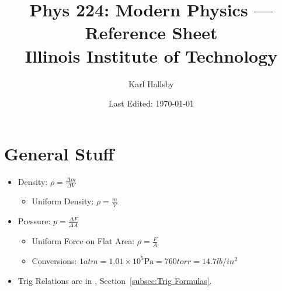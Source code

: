 


\graphicspath{{./Drawings/Phys_224/}} %

\theoremstyle{remark}
\newtheorem{note}{Note}[definition] %
\newtheorem*{note*}{Note}

\DeclareMathOperator{\PLD}{\text{PLD}}
\DeclareMathOperator{\Intensity}{I}

\begin{titlepage}
  \title{Phys 224: Modern Physics --- Reference Sheet \\ Illinois Institute of Technology}
  \author{Karl Hallsby}
  \date{Last Edited: \today}
\end{titlepage}


\maketitle
{}
\tableofcontents
\newpage
{}

\section{General Stuff}\label{sec:General}
\begin{itemize}[noitemsep]
\item Density: $\rho = \frac{\Delta m}{\Delta V}$
  \begin{itemize}
  \item Uniform Density: $\rho = \frac{m}{V}$
  \end{itemize}
\item Pressure: $p = \frac{\Delta F}{\Delta A}$
  \begin{itemize}
  \item Uniform Force on Flat Area: $\rho = \frac{F}{A}$
  \item Conversions: $1 atm = 1.01 \times 10^5 \si{\pascal} = 760 torr = 14.7 lb/in^2$
  \end{itemize}
\item Trig Relations are in , Section~\ref{subsec:Trig Formulas}.
\end{itemize}

